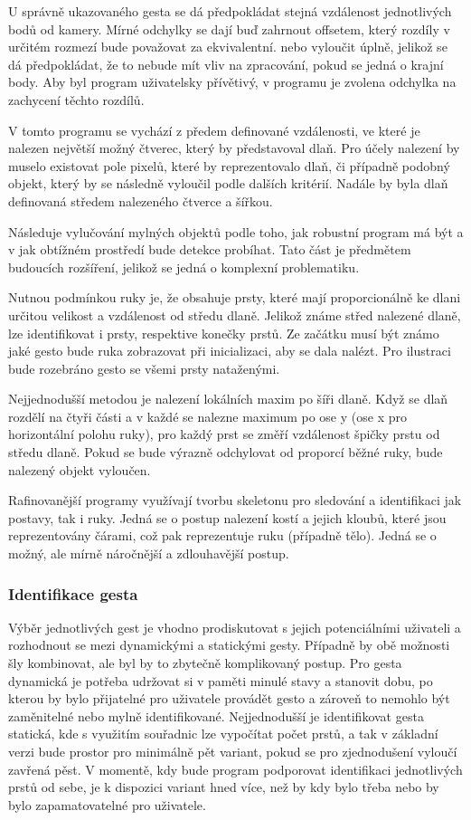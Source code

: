 U správně ukazovaného gesta se dá předpokládat stejná vzdálenost jednotlivých bodů od kamery. Mírné odchylky se dají buď zahrnout offsetem, který rozdíly v určitém rozmezí bude považovat za ekvivalentní. nebo vyloučit úplně, jelikož se dá předpokládat, že to nebude mít vliv na zpracování, pokud se jedná o krajní body. Aby byl program uživatelsky přívětivý, v programu je zvolena odchylka na zachycení těchto rozdílů.

V tomto programu se vychází z předem definované vzdálenosti, ve které je nalezen největší možný čtverec, který by představoval dlaň. Pro účely nalezení by muselo existovat pole pixelů, které by reprezentovalo dlaň, či případně podobný objekt, který by se následně vyloučil podle dalších kritérií. Nadále by byla dlaň definovaná středem nalezeného čtverce a šířkou.

Následuje vylučování mylných objektů podle toho, jak robustní program má být a v jak obtížném prostředí bude detekce probíhat. Tato část je předmětem budoucích rozšíření, jelikož se jedná o komplexní problematiku.

Nutnou podmínkou ruky je, že obsahuje prsty, které mají proporcionálně ke dlani určitou velikost a vzdálenost od středu dlaně. Jelikož známe střed nalezené dlaně, lze identifikovat i prsty, respektive konečky prstů. Ze začátku musí být známo jaké gesto bude ruka zobrazovat při inicializaci, aby se dala nalézt. Pro ilustraci bude rozebráno gesto se všemi prsty nataženými. 

Nejjednodušší metodou je nalezení lokálních maxim po šíři dlaně. Když se dlaň rozdělí na čtyři části a v každé se nalezne maximum po ose y (ose x pro horizontální polohu ruky), pro každý prst se změří vzdálenost špičky prstu od středu dlaně. Pokud se bude výrazně odchylovat od proporcí běžné ruky, bude nalezený objekt vyloučen.

Rafinovanější programy využívají tvorbu skeletonu pro sledování a identifikaci jak postavy, tak i ruky. Jedná se o postup nalezení kostí a jejich kloubů, které jsou reprezentovány čárami, což pak reprezentuje ruku (případně tělo). Jedná se o možný, ale mírně náročnější a zdlouhavější postup.

\subsubsection{Identifikace gesta}
Výběr jednotlivých gest je vhodno prodiskutovat s jejich potenciálními uživateli a rozhodnout se mezi dynamickými a statickými gesty. Případně by obě možnosti šly kombinovat, ale byl by to zbytečně komplikovaný postup. Pro gesta dynamická je potřeba udržovat si v paměti minulé stavy a stanovit dobu, po kterou by bylo přijatelné pro uživatele provádět gesto a zároveň to nemohlo být zaměnitelné nebo mylně identifikované. Nejjednodušší je identifikovat gesta statická, kde s využitím souřadnic lze vypočítat počet prstů, a tak v základní verzi bude prostor pro minimálně pět variant, pokud se pro zjednodušení vyloučí zavřená pěst. V momentě, kdy bude program podporovat identifikaci jednotlivých prstů od sebe, je k dispozici variant hned více, než by kdy bylo třeba nebo by bylo zapamatovatelné pro uživatele.

